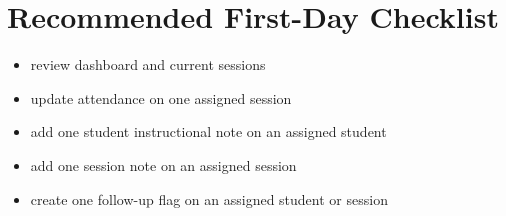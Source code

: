 \documentclass[11pt]{article}
\begin{document}
\section*{Recommended First-Day Checklist}
\begin{itemize}
  \item review dashboard and current sessions
  \item update attendance on one assigned session
  \item add one student instructional note on an assigned student
  \item add one session note on an assigned session
  \item create one follow-up flag on an assigned student or session
\end{itemize}
\end{document}
